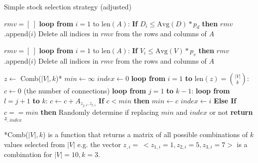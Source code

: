 \tablespacing
\begin{algorithm}[H]
	\caption{Simple stock selection strategy 
	(adjusted)}\label{alg:usage:stockselection2}
	\begin{algorithmic}[1]
		
		\State $rmv = [\ ]$
		\State \textbf{loop from} $i = 1$ to $\text{len}(A)$:
		\State \indent \textbf{If} $D_i \leq \text{Avg}(D) * p_d$ 
		\textbf{then} 
		$rmv$.append($i$)
		\State Delete all indices in $rmv$ from the rows and columns of $A$
		\EndFunction
		
		\State $rmv = [\ ]$
		\State \textbf{loop from} $i = 1$ to $\text{len}(A)$:
		\State \indent \textbf{If} $V_i \leq \text{Avg}(V) * p_v$ 
		\textbf{then} 
		$rmv$.append($i$)
		\State Delete all indices in $rmv$ from the rows and columns of $A$
		\EndFunction

		\State $z \gets$ Comb($|V|,k$)*
		\State $min \gets \infty$
		\State $index \gets 0$
		\State \textbf{loop from} $i=1$ \textbf{to} $\text{len}(z) = 
		{|V| \choose k}$:
		\State \indent $c \gets 0$ (the number of connections)
		\State \indent \textbf{loop from} $j = 1$ \textbf{to} $k-1$:
		\State \indent \indent \textbf{loop from} $l=j+1$ \textbf{to} $k$:
		\State \indent \indent \indent $c \gets c+A_{z_{j,i},z_{l,i}}$
		\State \indent \textbf{If} $c < min$ \textbf{then}
		\State \indent \indent $min \gets c$
		\State \indent \indent $index \gets i$
		\State \indent \textbf{Else If} $c == min$ \textbf{then}
		\State \indent \indent Randomly determine if replacing $min$ and 
		$index$ or not
		\State \textbf{return} $z_{,index}$
		\EndFunction
		\EndProcedure
	\end{algorithmic}
	*Comb($|V|,k$) is a function that returns a matrix of all possible 
	combinations of $k$ values selected from $|V|$ e.g. the vector $z_{,i}= \ 
	<z_{1,i} = 1, z_{2,i} = 5, z_{3,i} = 7>$ is a combination for $|V|=10,k=3$.
\end{algorithm}
\bodyspacing